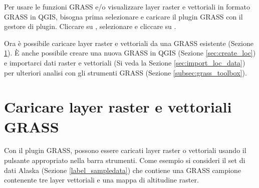 Per usare le funzioni GRASS e/o visualizzare layer raster e vettoriali in
formato GRASS in QGIS, bisogna prima selezionare e caricare il plugin GRASS con il
gestore di plugin. 
Cliccare su  \arrow {}, 
selezionare  e cliccare su . 

Ora è possibile caricare layer raster e vettoriali da una 
GRASS esistente (Sezione \ref{sec:load_grassdata}). È anche
possibile creare una nuova  GRASS in QGIS (Sezione \ref{sec:create_loc}) 
e importarci dati raster e vettoriali (Si
veda la Sezione \ref{sec:import_loc_data}) per ulteriori analisi con gli
strumenti GRASS (Sezione \ref{subsec:grass_toolbox}).

\section{Caricare layer raster e vettoriali GRASS}\label{sec:load_grassdata}

Con il plugin GRASS, possono essere caricati layer raster o vettoriali
usando il pulsante appropriato nella barra strumenti. Come esempio si
consideri il set di dati Alaska (Sezione \ref{label_sampledata}) che contiene una  
GRASS campione contenente tre layer vettoriali e una mappa di altitudine raster.

